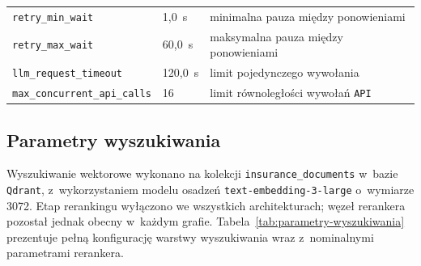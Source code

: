 \begin{table}[H]
\begin{tabular}{@{} l l l @{}}
      \texttt{retry\_min\_wait}
      & 1{,}0~s          & minimalna pauza między ponowieniami      \\
      \texttt{retry\_max\_wait}
      & 60{,}0~s         & maksymalna pauza między ponowieniami     \\
      \texttt{llm\_request\_timeout}
      & 120{,}0~s        & limit pojedynczego wywołania             \\
      \texttt{max\_concurrent\_api\_calls}
      & 16               & limit równoległości wywołań \texttt{API} \\
      \bottomrule
    \end{tabular}
  \end{table}

  \subsection{Parametry wyszukiwania}\label{subsec:parametry-wyszukiwania}

  Wyszukiwanie wektorowe wykonano na kolekcji \texttt{insurance\_documents}
  w~bazie \texttt{Qdrant}, z~wykorzystaniem modelu osadzeń
  \texttt{text-embedding-3-large} o~wymiarze 3072. Etap rerankingu wyłączono we
  wszystkich architekturach; węzeł rerankera pozostał jednak obecny w~każdym
  grafie. Tabela~\ref{tab:parametry-wyszukiwania} prezentuje pełną konfigurację
  warstwy wyszukiwania wraz z~nominalnymi parametrami rerankera.

